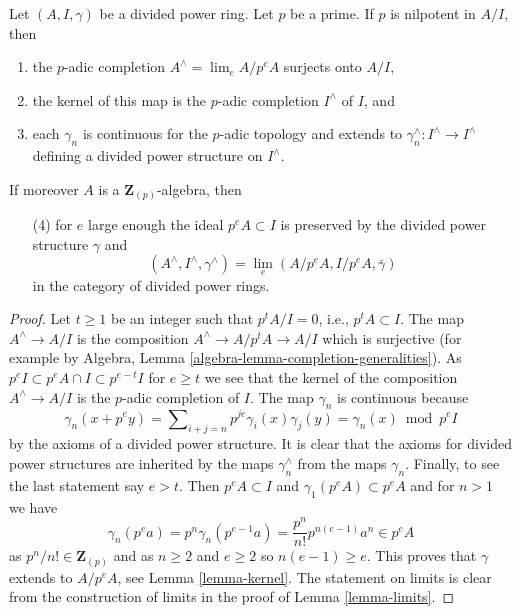 \begin{lemma}
\label{lemma-extend-to-completion}
Let $(A, I, \gamma)$ be a divided power ring. Let $p$ be a prime.
If $p$ is nilpotent in $A/I$, then
\begin{enumerate}
\item the $p$-adic completion $A^\wedge = \lim_e A/p^eA$ surjects onto $A/I$,
\item the kernel of this map is the $p$-adic completion $I^\wedge$ of $I$, and
\item each $\gamma_n$ is continuous for the $p$-adic topology and extends
to $\gamma_n^\wedge : I^\wedge \to I^\wedge$ defining a divided power
structure on $I^\wedge$.
\end{enumerate}
If moreover $A$ is a $\mathbf{Z}_{(p)}$-algebra, then
\begin{enumerate}
\item[(4)] for $e$ large enough the ideal $p^eA \subset I$ is preserved by the
divided power structure $\gamma$ and
$$
(A^\wedge, I^\wedge, \gamma^\wedge) = \lim_e (A/p^eA, I/p^eA, \bar\gamma)
$$
in the category of divided power rings.
\end{enumerate}
\end{lemma}

\begin{proof}
Let $t \geq 1$ be an integer such that $p^tA/I = 0$, i.e., $p^tA \subset I$.
The map $A^\wedge \to A/I$ is the composition $A^\wedge \to A/p^tA \to A/I$
which is surjective (for example by
Algebra, Lemma \ref{algebra-lemma-completion-generalities}).
As $p^eI \subset p^eA \cap I \subset p^{e - t}I$ for $e \geq t$ we see
that the kernel of the composition $A^\wedge \to A/I$ is the $p$-adic
completion of $I$. The map $\gamma_n$ is continuous because
$$
\gamma_n(x + p^ey) =
\sum\nolimits_{i + j = n} p^{je}\gamma_i(x)\gamma_j(y) =
\gamma_n(x) \bmod p^eI
$$
by the axioms of a divided power structure. It is clear that the axioms
for divided power structures are inherited by the maps $\gamma_n^\wedge$
from the maps $\gamma_n$. Finally, to see the last statement say $e > t$.
Then $p^eA \subset I$ and $\gamma_1(p^eA) \subset p^eA$ and for $n > 1$
we have
$$
\gamma_n(p^ea) = p^n \gamma_n(p^{e - 1}a) = \frac{p^n}{n!} p^{n(e - 1)}a^n
\in p^e A
$$
as $p^n/n! \in \mathbf{Z}_{(p)}$ and as $n \geq 2$ and $e \geq 2$ so
$n(e - 1) \geq e$.
This proves that $\gamma$ extends to $A/p^eA$, see Lemma \ref{lemma-kernel}.
The statement on limits is clear from the construction of limits in
the proof of Lemma \ref{lemma-limits}.
\end{proof}




